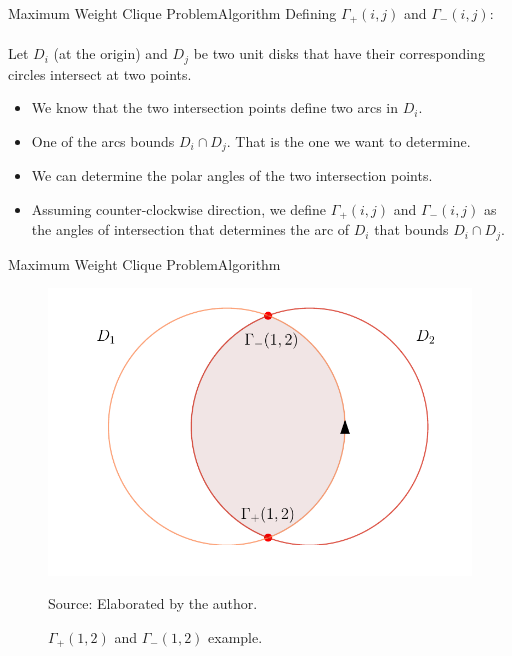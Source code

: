 \documentclass{beamer}
\newcommand{\source}[1]{\caption*{Source: {#1}} }
\begin{document}
\begin{frame}{Maximum Weight Clique Problem}{Algorithm}
	Defining $\Gamma_+(i,j)$ and $\Gamma_-(i,j)$:\\~\\

	Let $D_i$ (at the origin) and $D_j$ be two unit disks that have their corresponding circles intersect at two points.
	
	\begin{itemize}
		\item We know that the two intersection points define two arcs in $D_i$.
		\item One of the arcs bounds $D_i\cap D_j$. That is the one we want to determine.
		
		\item We can determine the polar angles of the two intersection points.
		\item Assuming counter-clockwise direction, we define $\Gamma_+(i,j)$ and $\Gamma_-(i,j)$ as the angles of intersection that determines the arc of $D_i$ that bounds $D_i \cap D_j$.
	\end{itemize}
\end{frame}

\begin{frame}{Maximum Weight Clique Problem}{Algorithm}

\begin{figure}
	\caption{$\Gamma_+(1,2)$ and $\Gamma_-(1,2)$ example.}
	\includegraphics[scale=0.65]{figures/gammas.pdf}
		\source{Elaborated by the author.}
\end{figure}
\end{frame}
\end{document}
